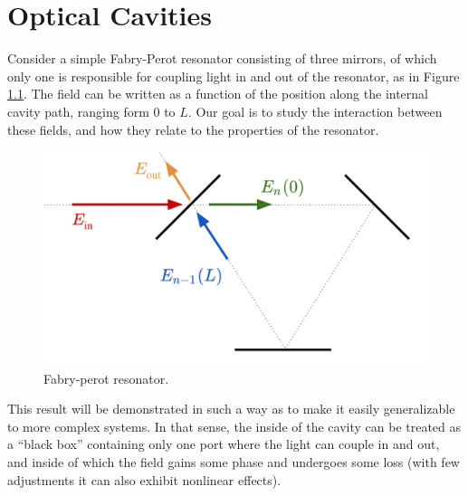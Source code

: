 \chapter{Optical Cavities}

Consider a simple Fabry-Perot resonator consisting of three mirrors, of which only one is responsible for coupling light in and out of the resonator, as in Figure \ref{fig:fabry.perot}. The field can be written as a function of the position along the internal cavity path, ranging form $0$ to $L$. Our goal is to study the interaction between these fields, and how they relate to the properties of the resonator.

\begin{figure}[H]
    \centering
    \includegraphics[width=0.75\linewidth]{Figuras/fabry-perot model.png}
    \caption{Fabry-perot resonator.}
    \label{fig:fabry.perot}
\end{figure}

This result will be demonstrated in such a  way as to make it easily generalizable to more complex systems. In that sense, the inside of the cavity can be treated as a ``black box'' containing only one port where the light can couple in and out, and inside of which the field gains some phase and undergoes some loss (with few adjustments it can also exhibit nonlinear effects).

